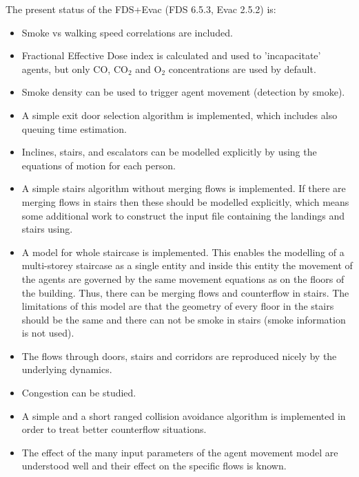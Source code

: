 \documentclass[12pt,a4paper,final,twoside]{stylevk}
\begin{document}
The present status of the FDS+Evac (FDS 6.5.3, Evac 2.5.2) is:
%
\begin{itemize}
%
\item Smoke vs walking speed correlations are included.
%
\item Fractional Effective Dose index is calculated and used to
  'incapacitate' agents, but only CO, CO${}_\mathrm{2}$ and
  O${}_\mathrm{2}$ concentrations are used by default.
%
\item Smoke density can be used to trigger agent movement (detection
  by smoke).
%
\item A simple exit door selection algorithm is implemented, which
  includes also queuing time estimation.
%
\item Inclines, stairs, and escalators can be modelled explicitly by
  using the equations of motion for each person.
%
\item A simple stairs algorithm without merging flows is implemented.
  If there are merging flows in stairs then these should be modelled
  explicitly, which means some additional work to construct the input
  file containing the landings and stairs using.
%
\item A model for whole staircase is implemented.  This enables the
  modelling of a multi-storey staircase as a single entity and inside
  this entity the movement of the agents are governed by the same
  movement equations as on the floors of the building.  Thus, there
  can be merging flows and counterflow in stairs.  The limitations of
  this model are that the geometry of every floor in the stairs should
  be the same and there can not be smoke in stairs (smoke information
  is not used).
%
\item The flows through doors, stairs and corridors are reproduced
  nicely by the underlying dynamics.
%
\item Congestion can be studied.
%
\item A simple and a short ranged collision avoidance algorithm is
  implemented in order to treat better counterflow situations.
%
\item The effect of the many input parameters of the agent movement
  model are understood well and their effect on the specific flows is
  known.
%
\end{itemize}
%
\end{document}
